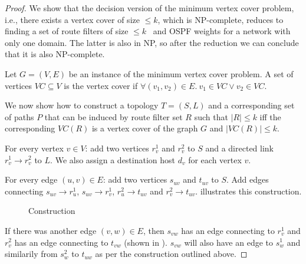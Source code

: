 \begin{proof}
We show that the decision version of the minimum 
vertex cover problem, i.e., there exists a vertex cover
of size $ \leq k$, which is NP-complete, 
reduces to finding a set of route filters of size $ \leq k$ \
and OSPF weights for a network with only one domain. 
The latter is also in NP, so after the reduction we 
can conclude that it is also NP-complete.

Let $G = (V,E)$ be an instance of the 
minimum vertex cover problem. A set of
vertices $VC \subseteq V$ is the vertex cover
if $\forall (v_1, v_2) \in E. ~v_1 \in VC \vee v_2 \in VC$. 

We now show how to construct a topology $T=(S,L)$ 
and a corresponding set of paths $P$ that can be 
induced by route filter set $R$ such that $|R| \leq k$  
iff the corresponding $VC(R)$ is a vertex cover of 
the graph $G$ and $|VC(R)| \leq k$.

For every vertex $v \in V$: add two vertices $r_v^1$ 
and $r_v^2$ to $S$ and a directed link $r_v^1 \rightarrow r_v^2$ to $L$. 
We also assign a destination host $d_v$ for each vertex $v$. 

For every edge $(u,v) \in E$: add two vertices $s_{uv}$
and $t_{uv}$ to $S$. Add edges
connecting $s_{uv} \rightarrow r_{u}^1$, $s_{uv} \rightarrow r_{v}^1$,
$r_{u}^2 \rightarrow t_{uv}$ and $r_{v}^2 \rightarrow t_{uv}$.  illustrates this construction.
\begin{figure}[H]
	\centering
	\caption{Construction}
	\label{fig:rfcomplexity}
\end{figure}
If there was another edge $(v,w) \in E$, then
$s_{vw}$ has an edge connecting to $r_v^1$ and
$r_v^2$ has an edge connecting to $t_{vw}$ (shown
in ). $s_{vw}$ will also 
have an edge to $s_w^1$ and similarily from $s_w^2$ to $t_{uw}$
as per the construction outlined above.


\end{proof}
